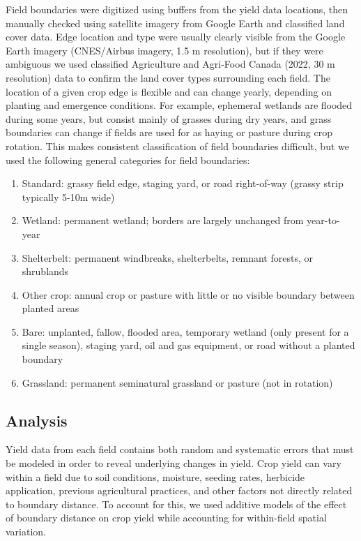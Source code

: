 \documentclass[]{elsarticle} %
\providecommand{\tightlist}{%
  \setlength{\itemsep}{0pt}\setlength{\parskip}{0pt}}
\begin{document}
Field boundaries were digitized using buffers from the yield data locations, then manually checked using satellite imagery from Google Earth and classified land cover data.
Edge location and type were usually clearly visible from the Google Earth imagery (CNES/Airbus imagery, 1.5 m resolution), but if they were ambiguous we used classified Agriculture and Agri-Food Canada (2022, 30 m resolution) data to confirm the land cover types surrounding each field.
The location of a given crop edge is flexible and can change yearly, depending on planting and emergence conditions.
For example, ephemeral wetlands are flooded during some years, but consist mainly of grasses during dry years, and grass boundaries can change if fields are used for as haying or pasture during crop rotation.
This makes consistent classification of field boundaries difficult, but we used the following general categories for field boundaries:

\begin{enumerate}
\def\labelenumi{\arabic{enumi}.}
\tightlist
\item Standard: grassy field edge, staging yard, or road right-of-way (grassy strip typically 5-10m wide)
\item Wetland: permanent wetland; borders are largely unchanged from year-to-year
\item Shelterbelt: permanent windbreaks, shelterbelts, remnant forests, or shrublands
\item Other crop: annual crop or pasture with little or no visible boundary between planted areas
\item Bare: unplanted, fallow, flooded area, temporary wetland (only present for a single season), staging yard, oil and gas equipment, or road without a planted boundary
\item Grassland: permanent seminatural grassland or pasture (not in rotation)
\end{enumerate}

\hypertarget{analysis}{%
\subsection{Analysis}\label{analysis}}

Yield data from each field contains both random and systematic errors that must be modeled in order to reveal underlying changes in yield.
Crop yield can vary within a field due to soil conditions, moisture, seeding rates, herbicide application, previous agricultural practices, and other factors not directly related to boundary distance.
To account for this, we used additive models of the effect of boundary distance on crop yield while accounting for within-field spatial variation.
\end{document}
